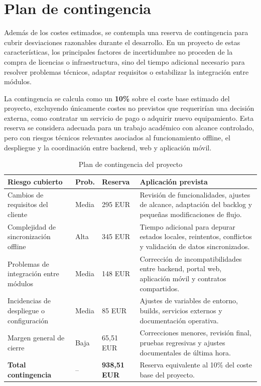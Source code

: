 \section{Plan de contingencia}

Además de los costes estimados, se contempla una reserva de contingencia para
cubrir desviaciones razonables durante el desarrollo. En un proyecto de estas
características, los principales factores de incertidumbre no proceden de la
compra de licencias o infraestructura, sino del tiempo adicional necesario para
resolver problemas técnicos, adaptar requisitos o estabilizar la integración entre
módulos.

La contingencia se calcula como un \textbf{10\%} sobre el coste base estimado del
proyecto, excluyendo únicamente costes no previstos que requerirían una decisión
externa, como contratar un servicio de pago o adquirir nuevo equipamiento. Esta
reserva se considera adecuada para un trabajo académico con alcance controlado,
pero con riesgos técnicos relevantes asociados al funcionamiento offline, el
despliegue y la coordinación entre backend, web y aplicación móvil.

\begin{table}[H]
\centering
\caption{Plan de contingencia del proyecto}
\label{tab:plan_contingencia}
\small
\renewcommand{\arraystretch}{1.18}
\begin{tabularx}{\textwidth}{p{4.1cm}p{1.5cm}p{2.2cm}X}
\toprule
\textbf{Riesgo cubierto} & \textbf{Prob.} & \textbf{Reserva} & \textbf{Aplicación prevista} \\
\midrule
Cambios de requisitos del cliente & Media & 295 EUR & Revisión de funcionalidades, ajustes de alcance, adaptación del backlog y pequeñas modificaciones de flujo. \\
Complejidad de sincronización offline & Alta & 345 EUR & Tiempo adicional para depurar estados locales, reintentos, conflictos y validación de datos sincronizados. \\
Problemas de integración entre módulos & Media & 148 EUR & Corrección de incompatibilidades entre backend, portal web, aplicación móvil y contratos compartidos. \\
Incidencias de despliegue o configuración & Media & 85 EUR & Ajustes de variables de entorno, builds, servicios externos y documentación operativa. \\
Margen general de cierre & Baja & 65,51 EUR & Correcciones menores, revisión final, pruebas regresivas y ajustes documentales de última hora. \\
\midrule
\textbf{Total contingencia} & -- & \textbf{938,51 EUR} & Reserva equivalente al 10\% del coste base del proyecto. \\
\bottomrule
\end{tabularx}
\end{table}

